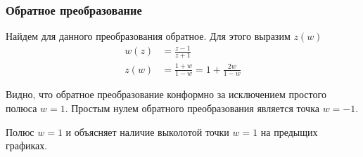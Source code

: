 \begin{frame}\frametitle{Обратное преобразование}
	Найдем для данного преобразования обратное.
	Для этого выразим \(z(w)\)
	\begin{align*}
		w(z) & = \frac{z-1}{z+1}                      \\
		z(w) & = \frac{1+w}{1-w} = 1 + \frac{2w}{1-w}
	\end{align*}

	Видно, что обратное преобразование конформно за исключением
	простого полюса \(w = 1\).
	Простым нулем обратного преобразования является точка \(w = -1\).

	Полюс \(w = 1\) и объясняет наличие выколотой точки \(w = 1\)
	на предыщих графиках.
\end{frame}

